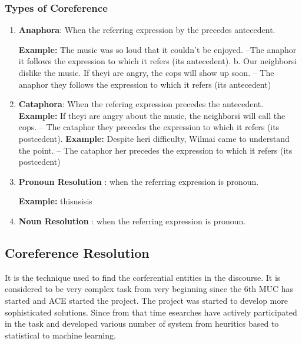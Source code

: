 \documentclass[11pt]{article}
\begin{document}
\subsubsection{Types of Coreference}

\begin{enumerate}
\item \textbf{Anaphora}: When the referring expression by the precedes antecedent.

\textbf{Example:} The music was so loud that it couldn't be enjoyed. –The anaphor it follows the expression to which it refers (its antecedent).
b. Our neighborsi dislike the music. If theyi are angry, the cops will show up soon. – The anaphor they follows the expression to which it refers (its antecedent)


\item \textbf{Cataphora}: When the refering expression precedes the antecedent.
\textbf{Example:}  If theyi are angry about the music, the neighborsi will call the cops. – The cataphor they precedes the expression to which it refers (its postcedent).
\textbf{Example:}  Despite heri difficulty, Wilmai came to understand the point. – The cataphor her precedes the expression to which it refers (its postcedent)

\item \textbf{Pronoun Resolution} : when the referring expression is pronoun.

\textbf{Example:} thisnsisis

\item \textbf{Noun Resolution} : when the referring expression is pronoun.

\end {enumerate}
\subsection{Coreference Resolution}
It is the technique used to find the corferential entities in the discourse. It is considered to be very complex task from very beginning since the 6th MUC has started and ACE started the project. The project was started to develop more sophisticated solutions. Since from that time esearches have actively participated in the task and developed various number of system from heuritics based to statistical to machine learning.
\end{document}

